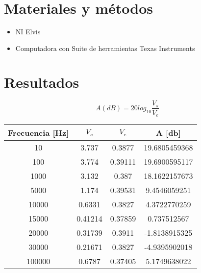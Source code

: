 \documentclass[]{article}
\begin{document}
\section{Materiales y métodos}

	\begin{itemize}
		\item NI Elvis
		\item Computadora con Suite de herramientas Texas Instruments
	\end{itemize}
	
\section{Resultados}



\begin{equation}
   A(dB)=20log_{10}\frac{V_s}{V_e}
\end{equation}




\begin{table}[h!]
	\centering
	\begin{tabular}{|c|c|c|c|}
		\hline
		Frecuencia [Hz] & $V_s$    & $V_e$    & A [db]    \\ \hline
		10                  & 3.737   & 0.3877  & 19.6805459368 \\ \hline
		100                 & 3.774   & 0.39111 & 19.6900595117 \\ \hline
		1000                & 3.132   & 0.387   & 18.1622157673 \\ \hline
		5000                & 1.174   & 0.39531 & 9.4546059251  \\ \hline
		10000               & 0.6331  & 0.3827  & 4.3722770259  \\ \hline
		15000               & 0.41214 & 0.37859 & 0.737512567   \\ \hline
		20000               & 0.31739 & 0.3911  & -1.8138915325 \\ \hline
		30000               & 0.21671 & 0.3827  & -4.9395902018 \\ \hline
		100000              & 0.6787  & 0.37405 & 5.1749638022  \\ \hline
	\end{tabular}
	\label{ATabla}
\end{table}


\end{document}
